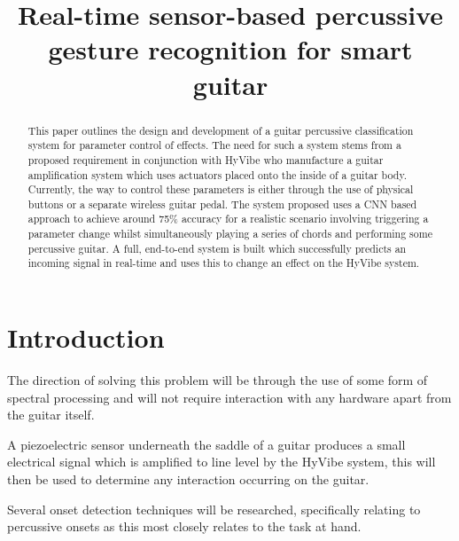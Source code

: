\documentclass[conference]{IEEEtran}
\begin{document}
\title{Real-time sensor-based percussive gesture recognition for smart guitar\\
}

\author{
}

\maketitle

\begin{abstract}
This paper outlines the design and development of a guitar percussive classification system for parameter control of effects. The need for such a system stems from a proposed
requirement in conjunction with HyVibe who manufacture a guitar amplification system which uses actuators placed onto the inside of a guitar body. Currently, the way to control these parameters is either
through the use of physical buttons or a separate wireless guitar pedal.
The system proposed uses a CNN based approach to achieve around 75\% accuracy for a realistic scenario involving triggering a parameter change whilst simultaneously playing a series of chords and performing some percussive guitar.
A full, end-to-end system is built which successfully predicts an incoming signal in real-time and uses this to change an effect on the HyVibe system.

\end{abstract}
 
\section{Introduction}
The direction of solving this problem will be through the use of some form of spectral processing and will not require interaction with any hardware apart from the guitar itself.

A piezoelectric sensor underneath the saddle of a guitar produces a small electrical signal which is amplified to line level by the HyVibe system, this will then be used to determine
any interaction occurring on the guitar.

Several onset detection techniques will be researched, specifically relating to percussive onsets as this most closely relates to the task at hand.
\end{document}
